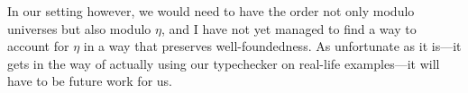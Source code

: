 In our setting however, we would need to have the order not only modulo
universes but also modulo \(\eta\), and I have not yet managed to find a way
to account for \(\eta\) in a way that preserves well-foundedness.
As unfortunate as it is---it gets in the way of actually using our typechecker
on real-life examples---it will have to be future work for us.